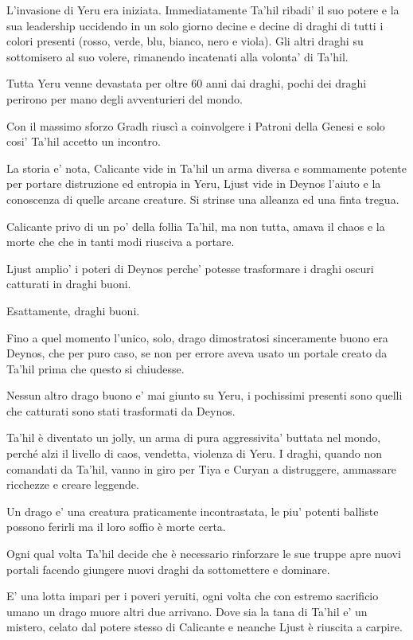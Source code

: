 \documentclass[a4paper,11pt,twoside,openany]{book}
\begin{document}
{L'invasione di Yeru era iniziata. Immediatamente Ta'hil ribadi' il suo potere e la sua leadership uccidendo in un solo giorno decine e decine di draghi di tutti i colori presenti (rosso, verde, blu, bianco, nero e viola).
Gli altri draghi su sottomisero al suo volere, rimanendo incatenati alla volonta' di Ta'hil.

Tutta Yeru venne devastata per oltre 60 anni dai draghi, pochi dei draghi perirono per mano degli avventurieri del mondo.

Con il massimo sforzo Gradh riuscì a coinvolgere i Patroni della Genesi e solo cosi' Ta'hil accetto un incontro.

La storia e' nota, Calicante vide in Ta'hil un arma diversa e sommamente potente per portare distruzione ed entropia in Yeru, Ljust vide in Deynos l'aiuto e la conoscenza di quelle arcane creature.
Si strinse una alleanza ed una finta tregua.

Calicante privo di un po' della follia Ta'hil, ma non tutta, amava il chaos e la morte che che in tanti modi riusciva a portare.

Ljust amplio' i poteri di Deynos perche' potesse trasformare i draghi oscuri catturati in draghi buoni.

Esattamente, draghi buoni.

Fino a quel momento l'unico, solo, drago dimostratosi sinceramente buono era Deynos, che per puro caso, se non per errore aveva usato un portale creato da Ta'hil prima che questo si chiudesse.

Nessun altro drago buono e' mai giunto su Yeru, i pochissimi presenti sono quelli che catturati sono stati trasformati da Deynos.

Ta'hil è diventato un jolly, un arma di pura aggressivita' buttata nel mondo, perché alzi il livello di caos, vendetta, violenza di Yeru.
I draghi, quando non comandati da Ta'hil, vanno in giro per Tiya e Curyan a distruggere, ammassare ricchezze e creare leggende.

Un drago e' una creatura praticamente incontrastata, le piu' potenti balliste possono ferirli ma il loro soffio è morte certa.

Ogni qual volta Ta'hil decide che è necessario rinforzare le sue truppe apre nuovi portali facendo giungere nuovi draghi da sottomettere e dominare.

E' una lotta impari per i poveri yeruiti, ogni volta che con estremo sacrificio umano un drago muore altri due arrivano. Dove sia la tana di Ta'hil e' un mistero, celato dal potere stesso di  Calicante e neanche Ljust è riuscita a carpire.

}
\end{document}
